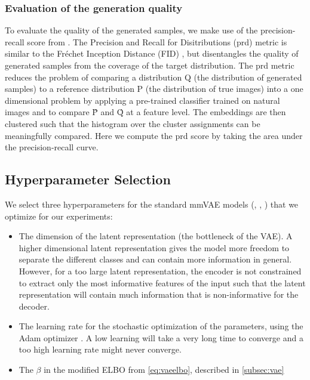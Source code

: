 \subsubsection{Evaluation of the generation quality}
\label{subsubsec:gen_qual}
To evaluate the quality of the generated samples, we make use of the precision-recall score from \cite{precision_recall_distributions}.
The Precision and Recall for Disitributions (prd) metric is similar to the Fréchet Inception Distance (FID) \citep{heusel_gans_2017}, but disentangles the quality of generated samples from the coverage of the target distribution.
The prd metric reduces the problem of comparing a distribution Q (the distribution of generated samples) to a reference distribution P (the distribution of true images) into a one dimensional problem by applying a pre-trained classifier trained on natural images and to compare \^{P} and \^{Q} at a feature level.
The embeddings are then clustered such that the histogram over the cluster assignments can be meaningfully compared.
Here we compute the prd score by taking the area under the precision-recall curve.

\subsection{Hyperparameter Selection}
We select three hyperparameters for the standard mmVAE models (, , ) that we optimize for our experiments:

\begin{itemize}
    \item The dimension of the latent representation (the bottleneck of the VAE).
    A higher dimensional latent representation gives the model more freedom to separate the different classes and can contain more information in general.
    However, for a too large latent representation, the encoder is not constrained to extract only the most informative features of the input such that the latent representation will contain much information that is non-informative for the decoder.
    \item The learning rate for the stochastic optimization of the parameters, using the Adam optimizer \citep{kingma_adam_2017}.
    A low learning will take a very long time to converge and a too high learning rate might never converge.
    \item The $\beta$ in the modified ELBO from \cref{eq:vaeelbo}, described in \cref{subsec:vae}
\end{itemize}

